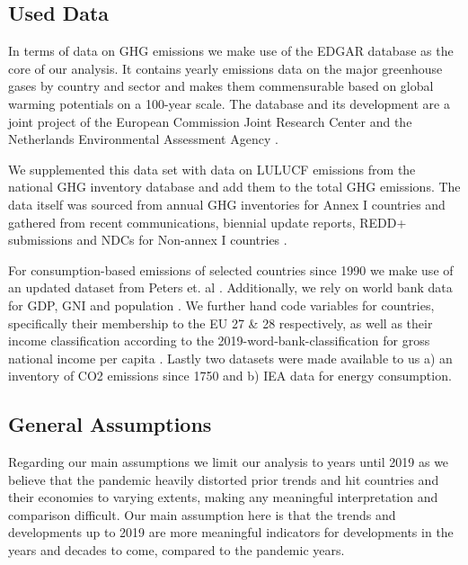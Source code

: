 \documentclass[
  12pt,
]{article}
\numberwithin{equation}{section}
\numberwithin{table}{section}
\numberwithin{figure}{section}
\begin{document}
\hypertarget{used-data}{%
\subsection{Used Data}\label{used-data}}

In terms of data on GHG emissions we make use of the EDGAR database as
the core of our analysis. It contains yearly emissions data on the major
greenhouse gases by country and sector and makes them commensurable
based on global warming potentials on a 100-year scale. The database and
its development are a joint project of the European Commission Joint
Research Center and the Netherlands Environmental Assessment Agency
\citep{EC2022}.

We supplemented this data set with data on LULUCF emissions from the
national GHG inventory database and add them to the total GHG emissions.
The data itself was sourced from annual GHG inventories for Annex I
countries and gathered from recent communications, biennial update
reports, REDD+ submissions and NDCs for Non-annex I countries
\citep{Giacomo2022}.

For consumption-based emissions of selected countries since 1990 we make
use of an updated dataset from Peters et. al \citep[updated
from][]{Peters2011}. Additionally, we rely on world bank data for GDP,
GNI and population \citep{WorldBank2022d}. We further hand code
variables for countries, specifically their membership to the EU 27 \&
28 respectively, as well as their income classification according to the
2019-word-bank-classification for gross national income per capita
\citep{WorldBank2018}. Lastly two datasets were made available to us a)
an inventory of CO2 emissions since 1750 and b) IEA data for energy
consumption.

\hypertarget{general-assumptions}{%
\subsection{General Assumptions}\label{general-assumptions}}

Regarding our main assumptions we limit our analysis to years until 2019
as we believe that the pandemic heavily distorted prior trends and hit
countries and their economies to varying extents, making any meaningful
interpretation and comparison difficult. Our main assumption here is
that the trends and developments up to 2019 are more meaningful
indicators for developments in the years and decades to come, compared
to the pandemic years.
\end{document}
